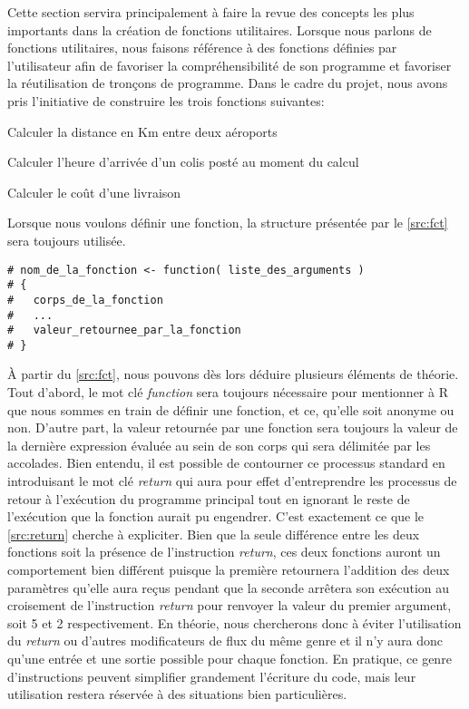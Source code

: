 Cette section servira principalement à faire la revue des concepts les plus importants dans la création de fonctions utilitaires. Lorsque nous parlons de fonctions utilitaires, nous faisons référence à des fonctions définies par l'utilisateur afin de favoriser la compréhensibilité de son programme et favoriser la réutilisation de tronçons de programme. Dans le cadre du projet, nous avons pris l'initiative de construire les trois fonctions suivantes: \\
\begin{description}[style=multiline,leftmargin=2.5cm]
	\item[airportsDist] Calculer la distance en Km entre deux aéroports
	\item[arrivalTime] Calculer l'heure d'arrivée d'un colis posté au moment du calcul
	\item[shippingCost] Calculer le coût d'une livraison
\end{description}

Lorsque nous voulons définir une fonction, la structure présentée par le \autoref{src:fct} sera toujours utilisée. 

\begin{lstlisting}[caption = Structure pour la définition d'une fonction,label=src:fct]
# nom_de_la_fonction <- function( liste_des_arguments )
# {
# 	corps_de_la_fonction
# 	... 
# 	valeur_retournee_par_la_fonction
# }
\end{lstlisting}

\vspace{\baselineskip}
À partir du \autoref{src:fct}, nous pouvons dès lors déduire plusieurs éléments de théorie. Tout d'abord, le mot clé \emph{function} sera toujours nécessaire pour mentionner à R que nous sommes en train de définir une fonction, et ce, qu'elle soit anonyme ou non. D'autre part, la valeur retournée par une fonction sera toujours la valeur de la dernière expression évaluée au sein de son corps qui sera délimitée par les accolades. Bien entendu, il est possible de contourner ce processus standard en introduisant le mot clé \emph{return} qui aura pour effet d'entreprendre les processus de retour à l'exécution du programme principal tout en ignorant le reste de l'exécution que la fonction aurait pu engendrer. C'est exactement ce que le \autoref{src:return} cherche à expliciter. Bien que la seule différence entre les deux fonctions soit la présence de l'instruction \emph{return}, ces deux fonctions auront un comportement bien différent puisque la première retournera l'addition des deux paramètres qu'elle aura reçus pendant que la seconde arrêtera son exécution au croisement de l'instruction \emph{return} pour renvoyer la valeur du premier argument, soit 5 et 2 respectivement. En théorie, nous chercherons donc à éviter l'utilisation du \emph{return} ou d'autres modificateurs de flux du même genre et il n'y aura donc qu'une entrée et une sortie possible pour chaque fonction. En pratique, ce genre d'instructions peuvent simplifier grandement l'écriture du code, mais leur utilisation restera réservée à des situations bien particulières.

